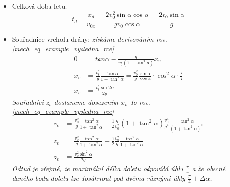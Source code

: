 \begin{example}
\begin{itemize}
    \item Celková doba letu:
      \begin{equation}\label{mech:eq_doba_letu}
        t_d=\frac{x_d}{v_{0x}} =\frac{2v_0^2\sin\alpha\cos\alpha}{gv_0\cos\alpha}
           =\frac{2v_0\sin\alpha}{g}
      \end{equation}

    \item Souřadnice vrcholu dráhy: \emph{získáme derivováním rov.
          \ref{mech_eq_example_vysledna_rce}}
          \begin{align}
            0   &= tan\alpha-\frac{g}{v_0^2(1+\tan^2\alpha)}x_v                         \\
            x_v &= \frac{v_0^2}{g}\frac{\tan\alpha}{1+\tan^2\alpha}=
                   \frac{v_0^2}{g}\frac{\sin\alpha}{\cos\alpha}
                   \cdot\cos^2\alpha\cdot\frac{2}{2}                                   \\
            x_v &= \frac{v_0^2\sin{2\alpha}}{2g}
           \end{align}
           \emph{Souřadnici $z_v$ dostaneme dosazením $x_v$  do rov.
           \ref{mech_eq_example_vysledna_rce}}
           \begin{align*}
             z_v &= \frac{v_0^2}{g}\frac{\tan^2\alpha}{1+\tan^2\alpha}-
                    \frac{1}{2}\frac{g}{v_0^2}(1+\tan^2\alpha)\frac{v_0^4}{g^2}
                    \frac{\tan^2\alpha}{(1+\tan^2\alpha)^2}                            \\
             z_v &= \frac{v_0^2}{g}\frac{\tan^2\alpha}{1+\tan^2\alpha}-
                    \frac{1}{2}\frac{v_0^2}{g}\frac{\tan^2\alpha}{1+\tan^2\alpha}      \\
             z_v &= \frac{v_0^2\sin^2\alpha}{2g}
      \end{align*}
      \emph{Odtud je zřejmé, že maximální délka doletu odpovídá úhlu $\frac{\pi}{4}$ a že obecně 
      daného bodu doletu lze dosáhnout pod dvěma různými úhly $\frac{\pi}{4}\pm\Delta\alpha$.}


\end{itemize}
\end{example}
